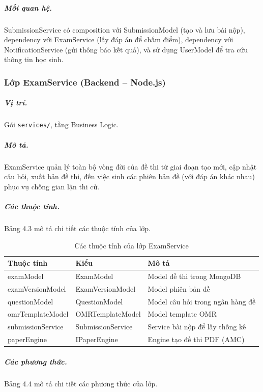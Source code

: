 ﻿\documentclass[../DoAn.tex]{subfiles}
\begin{document}
\subparagraph{Mối quan hệ.} SubmissionService có composition với SubmissionModel (tạo và lưu bài nộp), dependency với ExamService (lấy đáp án để chấm điểm), dependency với NotificationService (gửi thông báo kết quả), và sử dụng UserModel để tra cứu thông tin học sinh.

\vspace{0.3cm}

\subsubsection{Lớp ExamService (Backend -- Node.js)}
\label{subsubsection:4.2.2.2}

\subparagraph{Vị trí.} Gói \texttt{services/}, tầng Business Logic.

\subparagraph{Mô tả.} ExamService quản lý toàn bộ vòng đời của đề thi từ giai đoạn tạo mới, cập nhật câu hỏi, xuất bản đề thi, đến việc sinh các phiên bản đề (với đáp án khác nhau) phục vụ chống gian lận thi cử.

\subparagraph{Các thuộc tính.} Bảng 4.3 mô tả chi tiết các thuộc tính của lớp.

\begin{table}[H]
\centering
\begin{tabular}{|p{4cm}|p{3.5cm}|p{5cm}|}
\hline
\textbf{Thuộc tính} & \textbf{Kiểu} & \textbf{Mô tả} \\ \hline
examModel & ExamModel & Model đề thi trong MongoDB \\ \hline
examVersionModel & ExamVersionModel & Model phiên bản đề \\ \hline
questionModel & QuestionModel & Model câu hỏi trong ngân hàng đề \\ \hline
omrTemplateModel & OMRTemplateModel & Model template OMR \\ \hline
submissionService & SubmissionService & Service bài nộp để lấy thống kê \\ \hline
paperEngine & IPaperEngine & Engine tạo đề thi PDF (AMC) \\ \hline
\end{tabular}
\caption{Các thuộc tính của lớp ExamService}
\label{table:exam_service_attrs}
\end{table}

\subparagraph{Các phương thức.} Bảng 4.4 mô tả chi tiết các phương thức của lớp.
\end{document}
